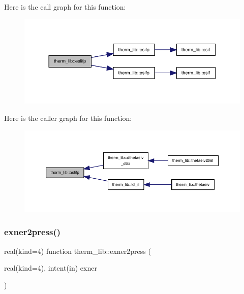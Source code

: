 Here is the call graph for this function\+:
\nopagebreak
\begin{figure}[H]
\begin{center}
\leavevmode
\includegraphics[width=350pt]{namespacetherm__lib_ac882ac1ca8840594af71761fc7c42306_cgraph}
\end{center}
\end{figure}
Here is the caller graph for this function\+:
\nopagebreak
\begin{figure}[H]
\begin{center}
\leavevmode
\includegraphics[width=350pt]{namespacetherm__lib_ac882ac1ca8840594af71761fc7c42306_icgraph}
\end{center}
\end{figure}
\mbox{\label{namespacetherm__lib_ae8677da076662844975419a4a4c74919}} 
\subsubsection{\texorpdfstring{exner2press()}{exner2press()}}
{\footnotesize\ttfamily real(kind=4) function therm\+\_\+lib\+::exner2press (\begin{DoxyParamCaption}\item[{real(kind=4), intent(in)}]{exner }\end{DoxyParamCaption})}

\mbox{\label{namespacetherm__lib_a547dc1767e5cae792b356d615db3ea09}} 

